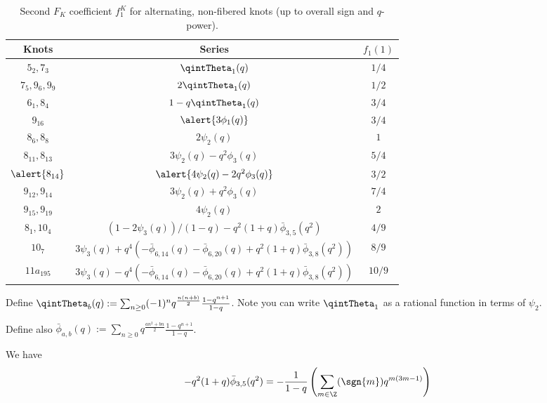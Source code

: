 \documentclass[11pt,e-only]{amsart}
\begin{document}
\begin{table}[h!]
    \centering
    \begin{tabular}{|c|c|c|}
        \hline
        Knots & Series & $f_1(1)$ \\
        \hline
        $5_2, 7_3$ & $\qintTheta_1(q)$ & $1/4$ \\ %
        $7_5,9_6,9_9$ & $2\qintTheta_1(q)$ & $1/2$ \\ %
        $6_1,8_4$ & $1 -q\qintTheta_1(q)$ & $3/4$ \\ %
        \alert{$9_{16}$} & $\alert{3\phi_1(q)}$ & $3/4$ \\ %
        $8_6,8_8$ & $2\psi_2(q)$ & $1$ \\
        $8_{11},8_{13}$ & $3\psi_2(q) - q^2 \phi_3(q)$ & $5/4$ \\
        $\alert{8_{14}}$ & $\alert{4\psi_2(q)-2q^2\phi_3(q)}$ & $3/2$ \\ %
        $9_{12},9_{14}$ & $3\psi_2(q) + q^2\phi_3(q)$ & $7/4$ \\
        $9_{15},9_{19}$ & $4\psi_2(q)$ & $2$ \\
        \hline
        $8_1,10_4$ & $\left(1-2\psi_3(q)\right)/(1-q)-q^2(1+q)\bar{\phi}_{3,5}(q^2)$ & $4/9$ \\ %
        $10_7$ & $3\psi_3(q) + q^4\left(-\bar{\phi}_{6,14}(q)-\bar{\phi}_{6,20}(q)+q^2(1+q)\bar{\phi}_{3,8}(q^2)\right)$ & $8/9$ \\
        $11a_{195}$ & $3\psi_3(q) - q^4\left(-\bar{\phi}_{6,14}(q)-\bar{\phi}_{6,20}(q)+q^2(1+q)\bar{\phi}_{3,8}(q^2)\right)$ & $10/9$ \\
        \hline
    \end{tabular}
    \caption{Second $F_K$ coefficient $f_1^K$ for alternating, non-fibered knots (up to overall sign and $q$-power).}
    \label{tab:second-FK}
\end{table}

Define $\qintTheta_b(q):=\sum_{n\geq 0}(-1)^nq^{\frac{n(n+b)}{2}}\frac{1-q^{n+1}}{1-q}$. Note you can write $\qintTheta_1$ as a rational function in terms of $\psi_2$.

Define also $\bar{\phi}_{a,b}(q):=\sum_{n\geq 0} q^{\frac{an^2+bn}{2}}\frac{1-q^{n+1}}{1-q}$.

We have
\begin{equation}
    -q^2 (1+q)\bar{\phi}_{3,5}(q^2)=-\frac{1}{1-q}\left(\sum_{m\in\Z} (\sgn{m}) q^{m(3m - 1)}\right)
\end{equation}
\end{document}
